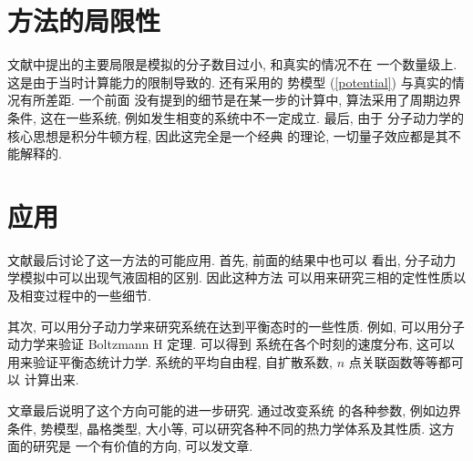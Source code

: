 \documentclass{ctexart}
\begin{document}
\section{方法的局限性}
文献中提出的主要局限是模拟的分子数目过小, 和真实的情况不在
一个数量级上. 这是由于当时计算能力的限制导致的. 还有采用的
势模型 (\ref{potential}) 与真实的情况有所差距. 一个前面
没有提到的细节是在某一步的计算中, 算法采用了周期边界条件,
这在一些系统, 例如发生相变的系统中不一定成立. 最后, 由于
分子动力学的核心思想是积分牛顿方程, 因此这完全是一个经典
的理论, 一切量子效应都是其不能解释的.

\section{应用}
文献最后讨论了这一方法的可能应用. 首先, 前面的结果中也可以
看出, 分子动力学模拟中可以出现气液固相的区别. 因此这种方法
可以用来研究三相的定性性质以及相变过程中的一些细节.

其次, 可以用分子动力学来研究系统在达到平衡态时的一些性质.
例如, 可以用分子动力学来验证 Boltzmann H 定理. 可以得到
系统在各个时刻的速度分布, 这可以用来验证平衡态统计力学.
系统的平均自由程, 自扩散系数, $n$ 点关联函数等等都可以
计算出来.

文章最后说明了这个方向可能的进一步研究. 通过改变系统
的各种参数, 例如边界条件, 势模型, 晶格类型, 大小等,
可以研究各种不同的热力学体系及其性质. 这方面的研究是
一个有价值的方向, 可以发文章.
\end{document}
